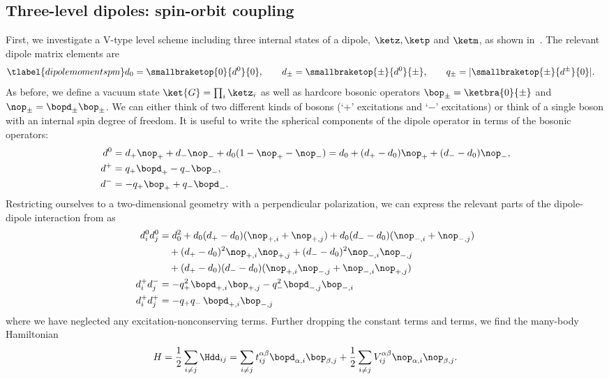 \subsection{Three-level dipoles: spin-orbit coupling}
First, we investigate a \textsf{V}-type level scheme including three internal states of a dipole, $\ketz, \ketp$ and $\ketm$, as shown in~. The relevant dipole matrix elements are
\begin{align} \tlabel{dipolemomentspm}
    d_0 = \smallbraketop{0}{d^0}{0}, \qquad
    d_\pm = \smallbraketop{\pm}{d^0}{\pm}, \qquad
    q_\pm &= |\smallbraketop{\pm}{d^\pm}{0}|.
\end{align}
As before, we define a vacuum state $\ket{G}=\prod_i \ketz_i$ as well as hardcore bosonic operators $\bop_\pm=\ketbra{0}{{\pm}}$ and $\nop_{\pm}=\bopd_{\pm}\bop_{\pm}$. We can either think of two different kinds of bosons (`$+$' excitations and `$-$' excitations) or think of a single boson with an internal spin degree of freedom. It is useful to write the spherical components of the dipole operator in terms of the bosonic operators:
\begin{align}
    d^0 &= d_+ \nop_+ + d_- \nop_- + d_0 (1-\nop_+-\nop_-) = d_0 + (d_+-d_0) \nop_+ + (d_--d_0) \nop_-, \\
    d^+ &= q_+ \bopd_+ - q_- \bop_-, \\
    d^- &= - q_+ \bop_+  + q_- \bopd_-.
\end{align}
Restricting ourselves to a two-dimensional geometry with a perpendicular polarization, we can express the relevant parts of the dipole-dipole interaction from  as
\begin{align}
    d^0_i d^0_j &= d_0^2 + d_0(d_+-d_0) (\nop_{+,i}+\nop_{+,j}) + d_0(d_--d_0) (\nop_{-,i}+\nop_{-,j}) \\
                &\quad + (d_+ - d_0)^2 \nop_{+,i} \nop_{+,j} + (d_- - d_0)^2 \nop_{-,i} \nop_{-,j} \\
                &\quad + (d_+ - d_0)(d_- - d_0) (\nop_{+,i} \nop_{-,j} + \nop_{-,i} \nop_{+,j}) \\
    d^+_i d^-_j &= - q_+^2 \bopd_{+,i} \bop_{+,j} - q_-^2 \bopd_{-,j} \bop_{-,i} \\
    d^+_i d^+_j &= - q_+q_- \, \bopd_{+,i} \bop_{-,j}
\end{align}
where we have neglected any excitation-nonconserving terms. Further dropping the constant terms and  terms, we find the many-body Hamiltonian
\begin{align}
    H = \frac{1}{2} \sum_{i\ne j} \Hdd_{ij} = \sum_{i\ne j}  t_{ij}^{\alpha\beta} \bopd_{\alpha,i} \bop_{\beta,j}
    +\frac{1}{2}\sum_{i\ne j} V_{ij}^{\alpha\beta} \nop_{\alpha,i} \nop_{\beta,j}.
\end{align}
